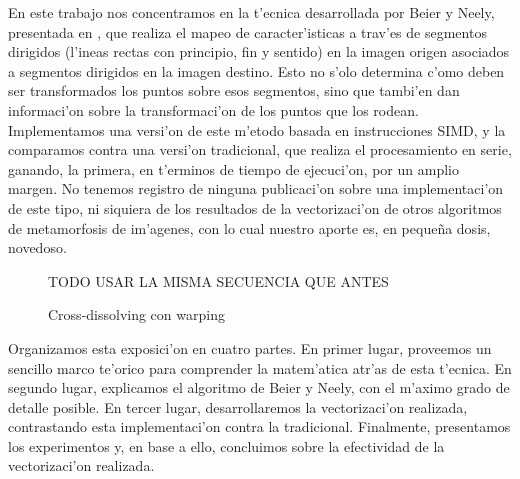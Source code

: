 En este trabajo nos concentramos en la t'ecnica desarrollada por Beier y Neely, presentada en \cite{1}, que realiza el mapeo de caracter'isticas a trav'es de segmentos dirigidos (l'ineas rectas con principio, fin y sentido) en la imagen origen asociados a segmentos dirigidos en la imagen destino. Esto no s'olo determina c'omo deben ser transformados los puntos sobre esos segmentos, sino que tambi'en dan informaci'on sobre la transformaci'on de los puntos que los rodean. Implementamos una versi'on de este m'etodo basada en instrucciones SIMD, y la comparamos contra una versi'on tradicional, que realiza el procesamiento en serie, ganando, la primera, en t'erminos de tiempo de ejecuci'on, por un amplio margen. No tenemos registro de ninguna publicaci'on sobre una implementaci'on de este tipo, ni siquiera de los resultados de la vectorizaci'on de otros algoritmos de metamorfosis de im'agenes, con lo cual nuestro aporte es, en peque\~{n}a dosis, novedoso.

\begin{figure}[H]
	TODO USAR LA MISMA SECUENCIA QUE ANTES
	\begin{center}
	\end{center}		
	\caption{Cross-dissolving con warping}
	\label{fig2}
\end{figure}

Organizamos esta exposici'on en cuatro partes. En primer lugar, proveemos un sencillo marco te'orico para comprender la matem'atica atr'as de esta t'ecnica. En segundo lugar, explicamos el algoritmo de Beier y Neely, con el m'aximo grado de detalle posible. En tercer lugar, desarrollaremos la vectorizaci'on realizada, contrastando esta implementaci'on contra la tradicional. Finalmente, presentamos los experimentos y, en base a ello, concluimos sobre la efectividad de la vectorizaci'on realizada.